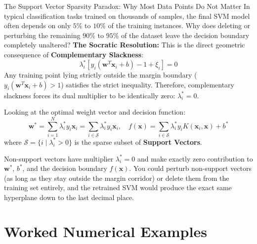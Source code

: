 \begin{ponderbox}{The Support Vector Sparsity Paradox: Why Most Data Points Do Not Matter}
In typical classification tasks trained on thousands of samples, the final SVM model often depends on only $5\%$ to $10\%$ of the training instances. Why does deleting or perturbing the remaining $90\%$ to $95\%$ of the dataset leave the decision boundary completely unaltered?
\tcblower
\textbf{The Socratic Resolution:} This is the direct geometric consequence of \textbf{Complementary Slackness}:
\begin{equation}
\lambda_i^* \left[ y_i(\mathbf{w}^T \mathbf{x}_i + b) - 1 + \xi_i \right] = 0
\end{equation}
Any training point lying strictly outside the margin boundary ($y_i(\mathbf{w}^T \mathbf{x}_i + b) > 1$) satisfies the strict inequality. Therefore, complementary slackness forces its dual multiplier to be identically zero: $\lambda_i^* = 0$.

Looking at the optimal weight vector and decision function:
\begin{equation}
\mathbf{w}^* = \sum_{i=1}^N \lambda_i^* y_i \mathbf{x}_i = \sum_{i \in \mathcal{S}} \lambda_i^* y_i \mathbf{x}_i, \quad f(\mathbf{x}) = \sum_{i \in \mathcal{S}} \lambda_i^* y_i K(\mathbf{x}_i, \mathbf{x}) + b^*
\end{equation}
where $\mathcal{S} = \{i \mid \lambda_i^* > 0\}$ is the sparse subset of \textbf{Support Vectors}.

Non-support vectors have multiplier $\lambda_i^* = 0$ and make exactly zero contribution to $\mathbf{w}^*$, $b^*$, and the decision boundary $f(\mathbf{x})$. You could perturb non-support vectors (as long as they stay outside the margin corridor) or delete them from the training set entirely, and the retrained SVM would produce the exact same hyperplane down to the last decimal place.
\end{ponderbox}

\section{Worked Numerical Examples}

